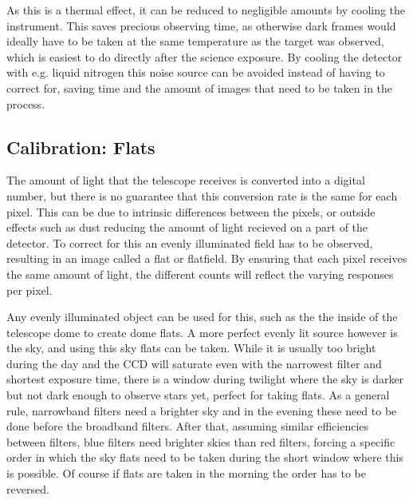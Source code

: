 \documentclass[a4paper,oneside,12pt, class=Latex/Classes/PhDthesisPSnPDF, crop=false]{standalone}
\begin{document}
As this is a thermal effect, it can be reduced to negligible amounts by cooling the instrument. This saves precious observing time, as otherwise dark frames would ideally have to be taken at the same temperature as the target was observed, which is easiest to do directly after the science exposure. By cooling the detector with e.g. liquid nitrogen this noise source can be avoided instead of having to correct for, saving time and the amount of images that need to be taken in the process.


\subsection{Calibration: Flats}
The amount of light that the telescope receives is converted into a digital number, but there is no guarantee that this conversion rate is the same for each pixel. This can be due to intrinsic differences between the pixels, or outside effects such as dust reducing the amount of light recieved on a part of the detector. To correct for this an evenly illuminated field has to be observed, resulting in an image called a flat or flatfield. By ensuring that each pixel receives the same amount of light, the different counts will reflect the varying responses per pixel.

Any evenly illuminated object can be used for this, such as the the inside of the telescope dome to create dome flats. A more perfect evenly lit source however is the sky, and using this sky flats can be taken. While it is usually too bright during the day and the CCD will saturate even with the narrowest filter and shortest exposure time, there is a window during twilight where the sky is darker but not dark enough to observe stars yet, perfect for taking flats. As a general rule, narrowband filters need a brighter sky and in the evening these need to be done before the broadband filters. After that, assuming similar efficiencies between filters, blue filters need brighter skies than red filters, forcing a specific order in which the sky flats need to be taken during the short window where this is possible. Of course if flats are taken in the morning the order has to be reversed.
\end{document}
